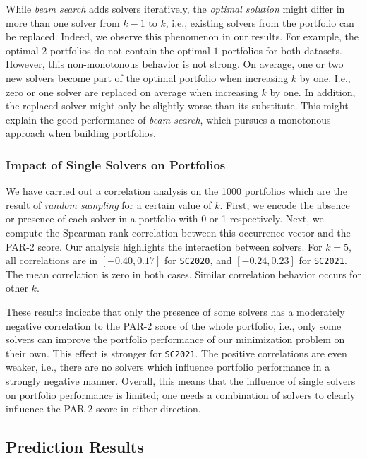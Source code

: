 \documentclass[runningheads]{llncs}
\begin{document}
While \emph{beam search} adds solvers iteratively, the \emph{optimal solution} might differ in more than one solver from $k-1$ to $k$, i.e., existing solvers from the portfolio can be replaced.
Indeed, we observe this phenomenon in our results.
For example, the optimal $2$-portfolios do not contain the optimal $1$-portfolios for both datasets.
However, this non-monotonous behavior is not strong.
On average, one or two new solvers become part of the optimal portfolio when increasing $k$ by one.
I.e., zero or one solver are replaced on average when increasing $k$ by one.
In addition, the replaced solver might only be slightly worse than its substitute.
This might explain the good performance of \emph{beam search}, which pursues a monotonous approach when building portfolios.

\subsubsection{Impact of Single Solvers on Portfolios}

We have carried out a correlation analysis on the 1000 portfolios which are the result of \emph{random sampling} for a certain value of $k$. 
First, we encode the absence or presence of each solver in a portfolio with 0 or 1 respectively.
Next, we compute the Spearman rank correlation between this occurrence vector and the PAR-2 score.
Our analysis highlights the interaction between solvers. 
For $k=5$, all correlations are in $[-0.40,0.17]$ for \texttt{SC2020}, and $[-0.24,0.23]$ for \texttt{SC2021}.
The mean correlation is zero in both cases.
Similar correlation behavior occurs for other $k$.

These results indicate that only the presence of some solvers has a moderately negative correlation to the PAR-2 score of the whole portfolio, i.e., only some solvers can improve the portfolio performance of our minimization problem on their own.
This effect is stronger for \texttt{SC2021}.
The positive correlations are even weaker, i.e., there are no solvers which influence portfolio performance in a strongly negative manner.
Overall, this means that the influence of single solvers on portfolio performance is limited; one needs a combination of solvers to clearly influence the PAR-2 score in either direction.

\subsection{Prediction Results}
\end{document}
